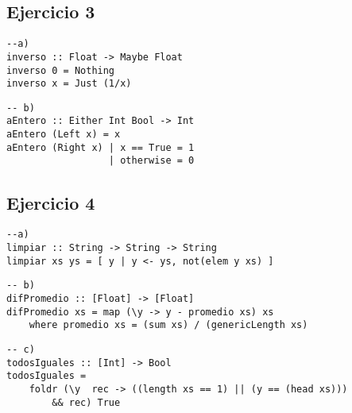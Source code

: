 \documentclass[10pt,a4paper]{article}
\begin{document}
\subsection{Ejercicio 3}
\begin{centrado}
\begin{verbatim}
--a)
inverso :: Float -> Maybe Float
inverso 0 = Nothing
inverso x = Just (1/x)
\end{verbatim}
\end{centrado}

\begin{centrado}
\begin{verbatim}
-- b)
aEntero :: Either Int Bool -> Int
aEntero (Left x) = x
aEntero (Right x) | x == True = 1
                  | otherwise = 0
\end{verbatim}
\end{centrado}

\subsection{Ejercicio 4}
\begin{centrado}
\begin{verbatim}
--a)
limpiar :: String -> String -> String
limpiar xs ys = [ y | y <- ys, not(elem y xs) ]
\end{verbatim}
\end{centrado}
\begin{centrado}
	\begin{verbatim}
-- b)
difPromedio :: [Float] -> [Float]
difPromedio xs = map (\y -> y - promedio xs) xs 
    where promedio xs = (sum xs) / (genericLength xs)
\end{verbatim}
\end{centrado}
\begin{centrado}
	\begin{verbatim}
-- c)
todosIguales :: [Int] -> Bool
todosIguales = 
	foldr (\y  rec -> ((length xs == 1) || (y == (head xs))) 
		&& rec) True
\end{verbatim}
\end{centrado}
\end{document}
